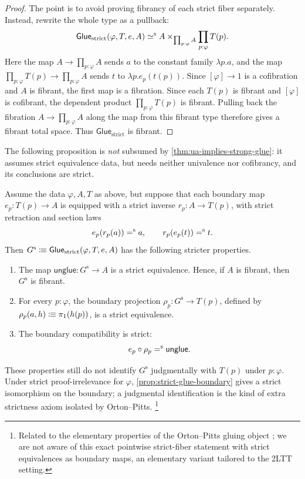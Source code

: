 \begin{longversion}
\begin{proof}
The point is to avoid proving fibrancy of each strict fiber separately. Instead,
rewrite the whole type as a pullback:
\[
  \mathsf{Glue}_{\mathrm{strict}}(\varphi,T,e,A)
  \mathrel{\simeq^\textup{s}}
  A \times_{\prod_{p:\varphi}A} \prod_{p:\varphi}T(p).
\]
Here the map \(A\to\prod_{p:\varphi}A\) sends \(a\) to the constant family
\(\lambda p.a\), and the map \(\prod_{p:\varphi}T(p)\to\prod_{p:\varphi}A\)
sends \(t\) to \(\lambda p.e_p(t(p))\). Since \([\varphi]\to 1\) is a
cofibration and \(A\) is fibrant, the first map is a fibration. Since each
\(T(p)\) is fibrant and \([\varphi]\) is cofibrant, the dependent product
\(\prod_{p:\varphi}T(p)\) is fibrant. Pulling back the fibration
\(A\to\prod_{p:\varphi}A\) along the map from this fibrant type therefore gives
a fibrant total space. Thus \(\mathsf{Glue}_{\mathrm{strict}}\) is fibrant.
\end{proof}

The following proposition is \emph{not} subsumed by
\cref{thm:ua-implies-strong-glue}: it assumes strict equivalence data, but
needs neither univalence nor cofibrancy, and its conclusions are strict.

\begin{proposition}\label{prop:strict-glue-from-strict-equivalences}
Assume the data \(\varphi,A,T\) as above, but suppose that each boundary map
\(e_p:T(p)\to A\) is equipped with a strict inverse \(r_p:A\to T(p)\), with
strict retraction and section laws
\[
  e_p(r_p(a))\mathrel{=^\textup{s}} a,
  \qquad
  r_p(e_p(t))\mathrel{=^\textup{s}} t.
\]
Then \(G^{\mathrm{s}}\mathrel{\vcentcolon\mspace{-1mu}\equiv}
\mathsf{Glue}_{\mathrm{strict}}(\varphi,T,e,A)\) has the following stricter
properties.
\begin{enumerate}
  \item The map \(\mathsf{unglue}:G^{\mathrm{s}}\to A\) is a strict equivalence.
        Hence, if \(A\) is fibrant, then \(G^{\mathrm{s}}\) is fibrant.
  \item For every \(p:\varphi\), the boundary projection
        \(\rho_p:G^{\mathrm{s}}\to T(p)\), defined by
        \(\rho_p(a,h)\mathrel{\vcentcolon\mspace{-1mu}\equiv} \pi_1(h(p))\), is a strict equivalence.
  \item The boundary compatibility is strict:
        \[
          e_p\circ \rho_p \mathrel{=^\textup{s}} \mathsf{unglue}.
        \]
\end{enumerate}
These properties still do not identify \(G^{\mathrm{s}}\) judgmentally with
\(T(p)\) under \(p:\varphi\). Under strict proof-irrelevance for \(\varphi\),
\cref{prop:strict-glue-boundary} gives a strict isomorphism on the boundary;
a judgmental identification is the kind of extra strictness axiom isolated by
Orton--Pitts.
\footnote{Related to the elementary properties of the Orton--Pitts gluing object \citep[Defs.~6.1, 6.11]{OrtonPitts2018}; we are not aware of this exact pointwise strict-fiber statement with strict equivalences as boundary maps, an elementary variant tailored to the 2LTT setting.}
\end{proposition}


\end{longversion}
